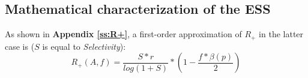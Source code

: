 \documentclass[a4paper,12pt]{report}
\begin{document}













\subsection{Mathematical characterization of the ESS}



As shown in \textbf{Appendix \ref{ss:R+}}, a first-order approximation of $R_+$
in the latter case is ($S$ is equal to \emph{Selectivity}):
\begin{equation}
    R_+(A,f) = \frac{S*r}{log(1+S)} * (1 - \frac{f*\beta(p)}{2})
\label{eq:R+}
\end{equation}
\end{document}
